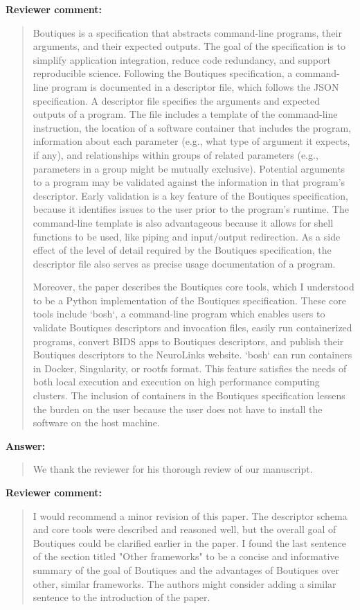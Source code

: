 \documentclass[a4]{article}
\newenvironment{review}%
{\textbf{Reviewer comment:}\begin{quote}}%
{\end{quote}}%
\newenvironment{answer}%
{\textbf{Answer:}\begin{quote}}%
{\end{quote}}%
\begin{document}
\begin{review}
Boutiques is a specification that abstracts command-line programs,
their arguments, and their expected outputs. The goal of the
specification is to simplify application integration, reduce code
redundancy, and support reproducible science. Following the Boutiques
specification, a command-line program is documented in a descriptor
file, which follows the JSON specification. A descriptor file
specifies the arguments and expected outputs of a program. The file
includes a template of the command-line instruction, the location of a
software container that includes the program, information about each
parameter (e.g., what type of argument it expects, if any), and
relationships within groups of related parameters (e.g., parameters in
a group might be mutually exclusive). Potential arguments to a program
may be validated against the information in that program's
descriptor. Early validation is a key feature of the Boutiques
specification, because it identifies issues to the user prior to the
program's runtime. The command-line template is also advantageous
because it allows for shell functions to be used, like piping and
input/output redirection. As a side effect of the level of detail
required by the Boutiques specification, the descriptor file also
serves as precise usage documentation of a program.

Moreover, the paper describes the Boutiques core tools, which I
understood to be a Python implementation of the Boutiques
specification. These core tools include `bosh`, a command-line program
which enables users to validate Boutiques descriptors and invocation
files, easily run containerized programs, convert BIDS apps to
Boutiques descriptors, and publish their Boutiques descriptors to the
NeuroLinks website. `bosh` can run containers in Docker, Singularity,
or rootfs format. This feature satisfies the needs of both local
execution and execution on high performance computing clusters. The
inclusion of containers in the Boutiques specification lessens the
burden on the user because the user does not have to install the
software on the host machine.
\end{review}

\begin{answer}
  We thank the reviewer for his thorough review of our manuscript.
\end{answer}


\begin{review}
I would recommend a minor revision of this paper. The descriptor
schema and core tools were described and reasoned well, but the
overall goal of Boutiques could be clarified earlier in the paper. I
found the last sentence of the section titled "Other frameworks" to be
a concise and informative summary of the goal of Boutiques and the
advantages of Boutiques over other, similar frameworks. The authors
might consider adding a similar sentence to the introduction of the
paper.
\end{review}
\end{document}
